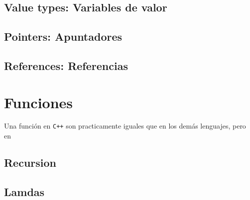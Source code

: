 \documentclass[12pt, fleqn]{report}                             %
\theoremstyle{break}                                            %
\newcommand \Cpp  {\texttt{C++} }                               %
\begin{document}
            \subsection{Value types: Variables de valor}

            \subsection{Pointers: Apuntadores}

            \subsection{References: Referencias}
            

        \section{Funciones}

            Una función en \Cpp son practicamente iguales que en los demás lenguajes, pero
            en 

            \subsection{Recursion}

            \subsection{Lamdas}
\end{document}
